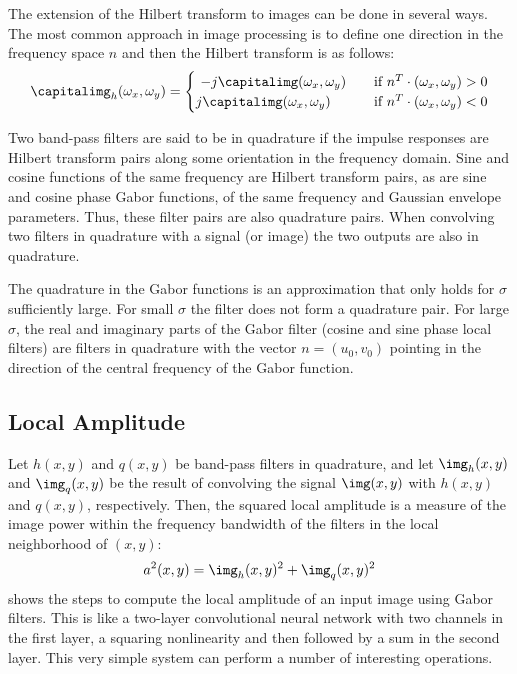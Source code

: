 The extension of the Hilbert transform to images can be done in several ways. The most common approach in image processing is to define one direction in the frequency space $n$ and then the Hilbert transform is as follows: 
\begin{equation}
\capitalimg_h(\omega_x,\omega_y) = \begin{cases}
    ~  - j \capitalimg(\omega_x,\omega_y)    & \quad \text{if } n^T \cdot (\omega_x,\omega_y) > 0 \\
    j \capitalimg(\omega_x,\omega_y)    & \quad \text{if } n^T \cdot (\omega_x,\omega_y) <0 \\
\end{cases}
\end{equation}

Two band-pass filters are said to be in quadrature if the impulse responses are Hilbert transform pairs along some orientation in the frequency domain.  Sine and cosine functions of the same frequency are Hilbert transform pairs, as are sine and cosine phase Gabor functions, of the same frequency and Gaussian envelope parameters.  Thus, these filter pairs are also quadrature pairs. When convolving two filters in quadrature with a signal (or image) the two outputs are also in quadrature.

The quadrature in the Gabor functions is an approximation that only holds for $\sigma$ sufficiently large. For small $\sigma$ the filter does not form a quadrature pair. For large $\sigma$, the real and imaginary parts of the Gabor filter (cosine and sine phase local filters) are filters in quadrature with the vector $n=(u_0,v_0)$ pointing in the direction of the central frequency of the Gabor function. 

\subsection{Local Amplitude}

Let $h(x,y)$ and $q(x,y)$ be band-pass filters in quadrature, and let $\img_h(x,y)$ and $\img_q(x,y)$ be the result of convolving the signal $\img(x,y)$ with $h(x,y)$ and $q(x,y)$, respectively.  Then, the squared local amplitude is a measure of the image power within the frequency bandwidth of the filters in the local neighborhood of $(x,y)$:
\begin{equation}
a^2(x,y) = \img_h(x,y)^2 + \img_q(x,y)^2
\end{equation}
\Fig{\ref{fig:quad2}} shows the steps to compute the local amplitude of an input image using Gabor filters. This is like a two-layer convolutional neural network with two channels in the first layer, a squaring nonlinearity and then followed by a sum in the second layer. This very simple system can perform a number of interesting operations.


